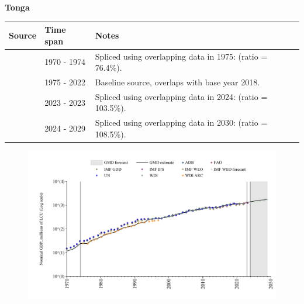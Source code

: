 \documentclass[12pt,a4paper,landscape]{article}
\begin{document}
\begin{adjustbox}{max totalsize={\paperwidth}{\paperheight},center}
\begin{minipage}[t][\textheight][t]{\textwidth}
\vspace*{0.5cm}
{}
\begin{center}
{\Large\bfseries Tonga}
\end{center}
\vspace{0.5cm}
\begin{table}[H]
\centering
\small
\begin{tabular}{|l|l|l|}
\hline
\textbf{Source} & \textbf{Time span} & \textbf{Notes} \\
\hline
\rowcolor{white}\cite{UN}& 1970 - 1974 &Spliced using overlapping data in 1975: (ratio = 76.4\%).\\
\rowcolor{lightgray}\cite{WDI}& 1975 - 2022 &Baseline source, overlaps with base year 2018.\\
\rowcolor{white}\cite{FAO}& 2023 - 2023 &Spliced using overlapping data in 2024: (ratio = 103.5\%).\\
\rowcolor{lightgray}\cite{IMF_WEO_forecast}& 2024 - 2029 &Spliced using overlapping data in 2030: (ratio = 108.5\%).\\
\hline
\end{tabular}
\end{table}
\begin{figure}[H]
\centering
\includegraphics[width=\textwidth,height=0.6\textheight,keepaspectratio]{graphs/TON_nGDP.pdf}
\end{figure}
\end{minipage}
\end{adjustbox}
\end{document}
